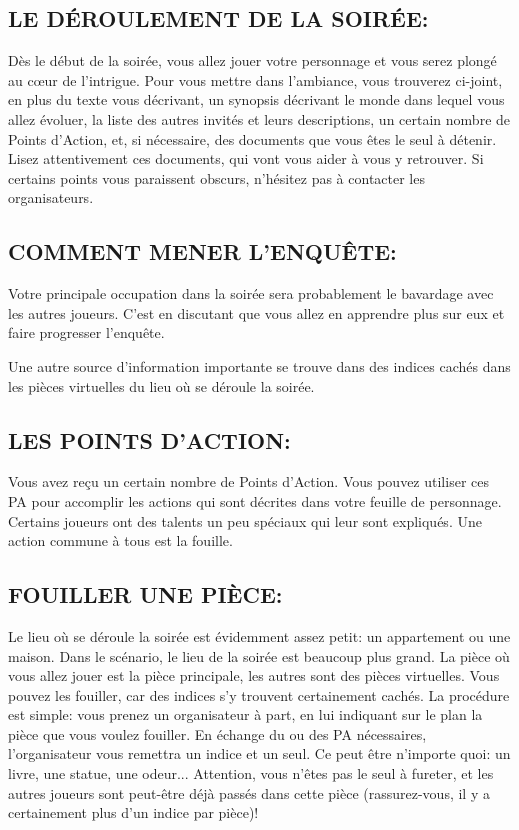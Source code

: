 \documentclass[14pt,twocolumn]{extarticle}
\begin{document}
\subsection{LE DÉROULEMENT DE LA SOIRÉE:}

Dès le début de la soirée, vous allez jouer votre personnage et vous serez
plongé au cœur de l'intrigue. Pour vous mettre dans l'ambiance, vous
trouverez ci-joint, en plus du texte vous décrivant, un synopsis décrivant le
monde dans lequel vous allez évoluer, la liste des autres invités et leurs
descriptions, un certain nombre de Points d'Action, et, si nécessaire, des
documents que vous êtes le seul à détenir. Lisez attentivement ces documents,
qui vont vous aider à vous y retrouver. Si certains points vous paraissent
obscurs, n'hésitez pas à contacter les organisateurs.

\subsection{COMMENT MENER L'ENQUÊTE:}

Votre principale occupation dans la soirée sera probablement le bavardage avec
les autres joueurs. C'est en discutant que vous allez en apprendre plus sur eux
et faire progresser l'enquête.

Une autre source d'information importante se trouve dans des indices cachés
dans les pièces virtuelles du lieu où se déroule la soirée.

\subsection{LES POINTS D'ACTION:}

Vous avez reçu un certain nombre de Points d'Action. Vous pouvez utiliser ces
PA pour accomplir les actions qui sont décrites dans votre feuille de
personnage. Certains joueurs ont des \og talents\fg{} un peu spéciaux qui leur
sont expliqués. Une action commune à tous est la \og fouille\fg{}.

\subsection{FOUILLER UNE PIÈCE:}

Le lieu où se déroule la soirée est évidemment assez petit: un appartement ou
une maison. Dans le scénario, le lieu de la soirée est beaucoup plus grand. La
pièce où vous allez jouer est la pièce principale, les autres sont des pièces
virtuelles. Vous pouvez les fouiller, car des indices s'y trouvent certainement
cachés. La procédure est simple: vous prenez un organisateur à part, en lui
indiquant sur le plan la pièce que vous voulez fouiller. En échange du ou des
PA nécessaires, l'organisateur vous remettra un indice et un seul. Ce peut être
n'importe quoi: un livre, une statue, une odeur... Attention, vous n'êtes pas
le seul à fureter, et les autres joueurs sont peut-être déjà passés dans cette
pièce (rassurez-vous, il y a certainement plus d'un indice par pièce)!
\end{document}
